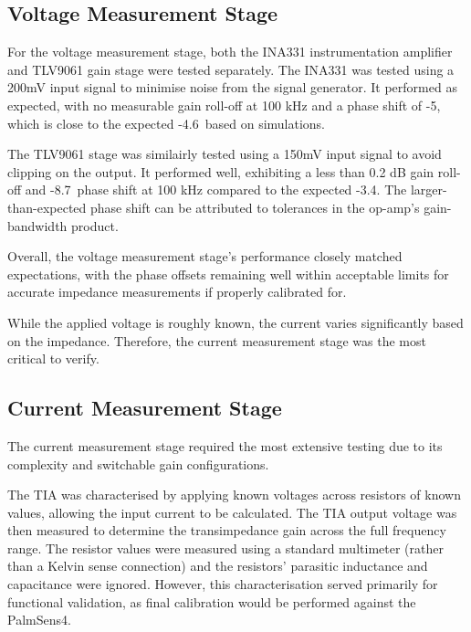 
\subsection{Voltage Measurement Stage} 
For the voltage measurement stage, both the INA331 instrumentation amplifier and TLV9061 gain stage were tested separately. The INA331 was tested using a 200mV input signal to minimise noise from the signal generator. It performed as expected, with no measurable gain roll-off at 100 kHz and a phase shift of -5\textdegree, which is close to the expected -4.6\textdegree\ based on simulations.

The TLV9061 stage was similairly tested using a 150mV input signal to avoid clipping on the output. It performed well, exhibiting a less than 0.2 dB gain roll-off and -8.7\textdegree\ phase shift at 100 kHz compared to the expected -3.4\textdegree. The larger-than-expected phase shift can be attributed to tolerances in the op-amp's gain-bandwidth product.

Overall, the voltage measurement stage's performance closely matched expectations, with the phase offsets remaining well within acceptable limits for accurate impedance measurements if properly calibrated for.

While the applied voltage is roughly known, the current varies significantly based on the impedance. Therefore, the current measurement stage was the most critical to verify.


\subsection{Current Measurement Stage} 
The current measurement stage required the most extensive testing due to its complexity and switchable gain configurations.

The TIA was characterised by applying known voltages across resistors of known values, allowing the input current to be calculated. The TIA output voltage was then measured to determine the transimpedance gain across the full frequency range. The resistor values were measured using a standard multimeter (rather than a Kelvin sense connection) and the resistors' parasitic inductance and capacitance were ignored. However, this characterisation served primarily for functional validation, as final calibration would be performed against the PalmSens4.

